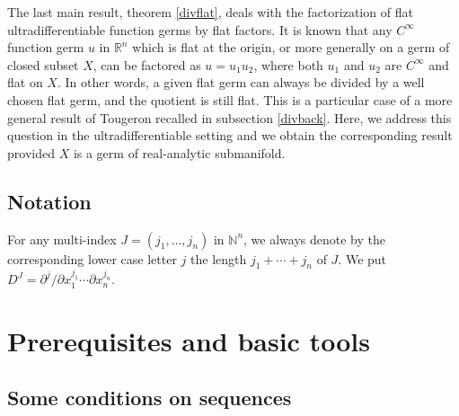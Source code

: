 \documentclass[a4paper]{amsart}
\theoremstyle{plain}
\theoremstyle{definition}
\theoremstyle{remark}
\begin{document}
The last main result, theorem \ref{divflat}, deals with the factorization of flat ultradifferentiable function germs by flat factors. It is known that
any $ C^\infty $ function germ $ u $ in $ \mathbb{R}^n $ which is flat at the origin, or more generally on a germ of closed subset $ X $, can be factored as $ u=u_1u_2 $, where
both $ u_1 $ and $ u_2 $ are $ C^\infty $ and flat on $ X $. In other words, a given flat germ can always be divided by a well chosen flat germ, and the quotient is still flat. This is a particular case of a more general result of Tougeron \cite{Tougbook} recalled in
subsection \ref{divback}. Here, we address this question in the ultradifferentiable setting and we obtain the corresponding result provided $ X $ is a germ of
real-analytic submanifold.

\subsection*{Notation} For any multi-index $ J=(j_1,\ldots,j_n) $ in $ \mathbb{N}^n $, we always denote by the corresponding lower case letter $ j $ the length $ j_1+\cdots+j_n $ of $ J $. We put $ D^J =\partial^j/\partial x_1^{j_1}\cdots\partial x_n^{j_n} $.

\section{Prerequisites and basic tools}\label{tools}

\subsection{Some conditions on sequences}\label{sequences}
\end{document}
